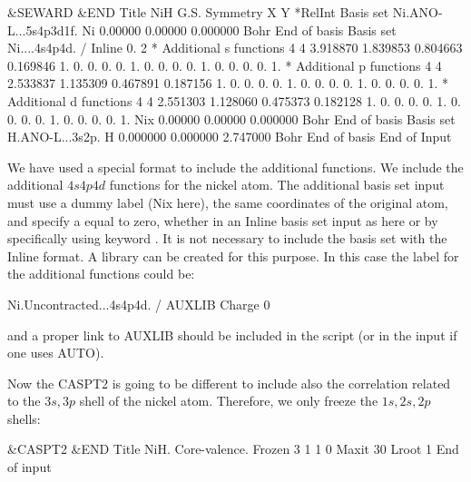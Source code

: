 
\begin{inputlisting}
 &SEWARD &END
Title
 NiH G.S.
Symmetry
X Y
*RelInt
Basis set
Ni.ANO-L...5s4p3d1f.
Ni    0.00000   0.00000   0.000000   Bohr
End of basis
Basis set
Ni....4s4p4d. / Inline
 0.  2
* Additional s functions
 4 4
3.918870 1.839853 0.804663 0.169846 
 1. 0. 0. 0.
 0. 1. 0. 0.
 0. 0. 1. 0.
 0. 0. 0. 1.
* Additional p functions
 4 4
2.533837 1.135309 0.467891 0.187156
 1. 0. 0. 0.
 0. 1. 0. 0.
 0. 0. 1. 0.
 0. 0. 0. 1.
* Additional d functions
 4 4
2.551303 1.128060 0.475373 0.182128
 1. 0. 0. 0.
 0. 1. 0. 0.
 0. 0. 1. 0.
 0. 0. 0. 1.
Nix   0.00000   0.00000   0.000000   Bohr
End of basis
Basis set
H.ANO-L...3s2p.
H     0.000000  0.000000  2.747000   Bohr
End of basis
End of Input
\end{inputlisting}


We have used a special format to include the additional functions.
We include the additional $4s4p4d$ functions for the nickel atom.
The additional basis set input must use a dummy label (Nix here), the 
same coordinates of the original atom, and 
specify a  equal to zero, whether in an Inline basis set 
input as here or by specifically using keyword . It is not
necessary to include the basis set with the Inline format. A library can
be created for this purpose. In this case the label for the additional
functions could be:


\begin{inputlisting}
Ni.Uncontracted...4s4p4d. / AUXLIB
Charge
0
\end{inputlisting}


and a proper link to AUXLIB should be included in the script (or in the
input if one uses AUTO).

Now the CASPT2 is going to be different to include also
the correlation related to the $3s,3p$ shell of the nickel atom. Therefore,
we only freeze the $1s,2s,2p$ shells:

\begin{inputlisting}
 &CASPT2 &END
Title
 NiH. Core-valence.
Frozen
3 1 1 0
Maxit
30
Lroot
1
End of input
\end{inputlisting}

